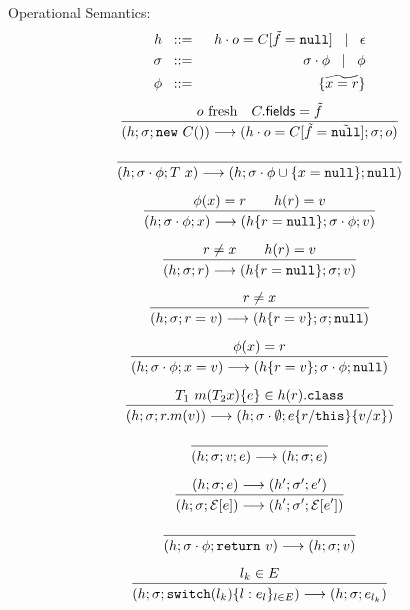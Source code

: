 \documentclass[a4paper]{llncs}
\newcommand{\class}{\ensuremath{\mathtt{class}}\xspace}
\newcommand{\nul}{\ensuremath{\mathtt{null}}\xspace}
\newcommand{\this}{\ensuremath{\mathtt{this}}\xspace}
\newcommand{\return}[1]{\ensuremath{\mathtt{return}}\ #1}
\newcommand{\method}[4]{#1\ #2(#3)\set{#4}}
\newcommand{\vdecl}[2]{#1\ #2}
\newcommand{\newo}[1]{\ensuremath{\mathtt{new}\ #1()}}
\newcommand{\switch}[2]{\ensuremath{\mathtt{switch}(#1)\set{#2}}}
\newcommand{\econtext}[2]{\mathcal{#1}[#2]}
\begin{document}
%
	Operational Semantics:
%
	\begin{eqnarray*}
		h &\bnfis& h \cat o = C[\vect{f} = \vec{\nul}] \bnfbar \epsilon\\
		\sigma &\bnfis& \sigma \cat \phi \bnfbar \phi\\
		\phi &\bnfis& \set{\widetilde{x = r}}
	\end{eqnarray*}
%
\[
	\begin{array}{c}
		\tree{
			o\ \textrm{fresh} \quad C.\mathsf{fields} = \vect{f}
		}{
			(h; \sigma; \newo{C}) \red (h \cat o = C[\vect{f} = \vect{\nul}]; \sigma; o)
		}
		\\[6mm]

		\tree{
		}{
			(h; \sigma \cat \phi; \vdecl{T}{x}) \red (h; \sigma \cat \phi \cup \set{x = \nul}; \nul)
		}
		\\[6mm]

		\tree{
			\phi(x) = r \qquad h(r) = v
		}{
			(h; \sigma \cat \phi; x) \red (h \set{r = \nul}; \sigma \cat \phi; v)
		}
		\\[6mm]


		\tree{
			r \not= x \qquad h(r) = v
		}{
			(h; \sigma; r) \red (h \set{r = \nul}; \sigma; v)
		}\\[6mm]

		\tree {
			r \not= x
		}{
			(h;\sigma; r = v) \red (h\set{r = v};\sigma; \nul)
		}\\[6mm]

		\tree {
			\phi(x) = r
		}{
			(h;\sigma \cat \phi; x = v) \red (h\set{r = v};\sigma \cat \phi; \nul)
		}\\[6mm]


		\tree {
			\method{T_1}{m}{T_2 x}{e} \in h(r).\class 
		}{
			(h;\sigma;r.m(v)) \red (h; \sigma \cat \es; e \subst{r}{\this} \subst{v}{x})
		}\\[6mm]

		\tree{}{(h; \sigma; v; e) \red (h; \sigma; e)}
		\\[6mm]

		\tree{
			(h; \sigma; e) \red (h'; \sigma'; e')
		}{
			(h; \sigma; \econtext{E}{e}) \red (h'; \sigma'; \econtext{E}{e'})
		}
		\\[6mm]

		\tree{}{(h;\sigma \cat \phi; \return{v}) \red (h;\sigma;v)}
		\\[6mm]

		\tree{
			l_k \in E
		}{
			(h;\sigma;\switch{l_k}{l: e_l}_{l \in E}) \red (h;\sigma; e_{l_k})
		}\\[6mm]


\end{array}\]
\end{document}
